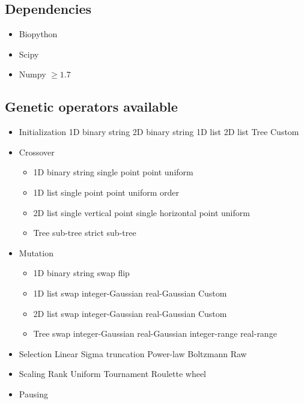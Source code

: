 \documentclass{article}
\begin{document}
	\subsection{Dependencies}
	\begin{itemize}
		\item Biopython
		\item Scipy
		\item Numpy $\geq 1.7$
	\end{itemize}
	\subsection{Genetic operators available}
	\begin{itemize}
		\item Initialization 
		\subitem 1D binary string 
		\subitem 2D binary string
		\subitem 1D list
		\subitem 2D list
		\subitem Tree
		\subitem Custom
		\item Crossover
		\begin{itemize}
			\item  1D binary string
			\subitem single point
			 point
			\subitem uniform
			\item 1D list 
			\subitem single point
			 point
			\subitem uniform 
			\subitem order
			\item 2D list  
			\subitem single vertical point
			\subitem single horizontal point
			\subitem uniform
			\item Tree 
			\subitem sub-tree
			\subitem strict sub-tree
		\end{itemize}
		\item Mutation 
		\begin{itemize}
			\item  1D binary string
			\subitem swap
			\subitem flip
			\item 1D list 
			\subitem swap
			\subitem integer-Gaussian 
			\subitem real-Gaussian
			\subitem Custom
			\item 2D list  
			\subitem swap
			\subitem integer-Gaussian 
			\subitem real-Gaussian
			\subitem Custom
			\item Tree 
			\subitem swap
			\subitem integer-Gaussian 
			\subitem real-Gaussian
			\subitem integer-range 
			\subitem real-range
		\end{itemize}
		\item Selection 
		\subitem Linear
		\subitem Sigma truncation
		\subitem Power-law
		\subitem Boltzmann
		\subitem Raw
		\item Scaling 
		\subitem Rank
		\subitem Uniform
		\subitem Tournament
		\subitem Roulette wheel
		\item Pausing
	\end{itemize}
\end{document}
